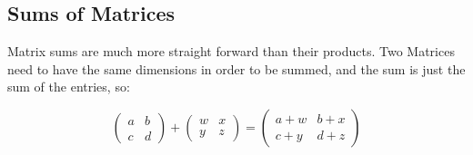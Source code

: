 \subsection{Sums of Matrices}

Matrix sums are much more straight forward than their products.  Two Matrices need to have the same dimensions in order to be summed, and the sum is just the sum of the entries, so:

$$\begin{pmatrix} a & b \\ c & d \end{pmatrix}+ \begin{pmatrix} w & x \\ y & z \end{pmatrix}=\begin{pmatrix} a+w & b+x \\ c+y & d+z \end{pmatrix}$$


